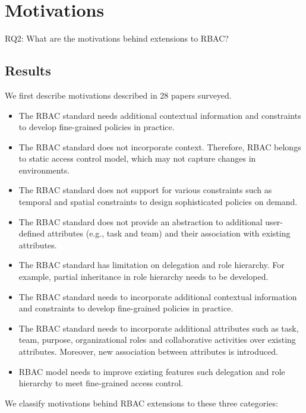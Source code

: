 \section{Motivations} \label{sec:motivations}

RQ2: What are the motivations behind extensions to RBAC?

\subsection{Results}

We first describe motivations described in 28 papers surveyed.

\begin{itemize}
\setlength{\itemsep}{0.25pt}
\item The RBAC standard needs additional contextual information and constraints to develop fine-grained policies in practice.
\item The RBAC standard does not incorporate context. Therefore, RBAC belongs to static access control model, which may not capture changes in environments.
\item The RBAC standard does not support for various constraints such as temporal and spatial constraints to design sophisticated policies on demand.
\item The RBAC standard does not provide an abstraction to additional user-defined attributes	(e.g., task and team) and their association with existing attributes.
\item The RBAC standard has limitation on delegation and role hierarchy. For example, partial inheritance in role hierarchy needs to be developed.  
\item The RBAC standard needs to incorporate additional contextual information and constraints to develop fine-grained policies in practice.
\item The RBAC standard needs to incorporate additional attributes such as
task, team, purpose, organizational roles and collaborative activities over existing attributes. Moreover, new association between attributes
is introduced. 
\item RBAC model needs to improve existing features such delegation and role hierarchy to meet fine-grained access control. 
\end{itemize}


We classify motivations behind RBAC extensions to these three categories:

